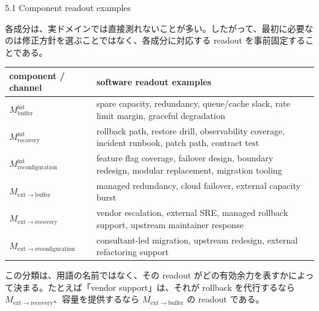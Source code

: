 \documentclass[12pt,a4paper]{article}
\begin{document}
5.1 Component readout examples

各成分は、実ドメインでは直接測れないことが多い。したがって、最初に必要なのは修正方針を選ぶことではなく、各成分に対応する readout を事前固定することである。

{\def\LTcaptype{table} %
\begin{longtable}[]{@{}
  >{\raggedright\arraybackslash}p{}
  >{\raggedright\arraybackslash}p{}
  >{\raggedright\arraybackslash}p{}@{}}
\toprule\noalign{}
\begin{minipage}[b]{\linewidth}\raggedright
component / channel
\end{minipage} & \begin{minipage}[b]{\linewidth}\raggedright
software readout examples
\end{minipage} & \begin{minipage}[b]{\linewidth}\raggedright
\end{minipage} \\
\midrule\noalign{}
\endhead
\bottomrule\noalign{}
\endlastfoot
\(M_{\mathrm{buffer}}^{\mathrm{int}}\) & spare capacity, redundancy, queue/cache slack, rate limit margin, graceful degradation & \\
\(M_{\mathrm{recovery}}^{\mathrm{int}}\) & rollback path, restore drill, observability coverage, incident runbook, patch path, contract test & \\
\(M_{\mathrm{reconfiguration}}^{\mathrm{int}}\) & feature flag coverage, failover design, boundary redesign, modular replacement, migration tooling & \\
\(M_{\mathrm{ext}\to\mathrm{buffer}}\) & managed redundancy, cloud failover, external capacity burst & \\
\(M_{\mathrm{ext}\to\mathrm{recovery}}\) & vendor escalation, external SRE, managed rollback support, upstream maintainer response & \\
\(M_{\mathrm{ext}\to\mathrm{reconfiguration}}\) & consultant-led migration, upstream redesign, external refactoring support & \\
\end{longtable}
}

この分類は、用語の名前ではなく、その readout がどの有効余力を表すかによって決まる。たとえば「vendor support」は、それが rollback を代行するなら \(M_{\mathrm{ext}\to\mathrm{recovery}}\)、容量を提供するなら \(M_{\mathrm{ext}\to\mathrm{buffer}}\) の readout である。
\end{document}
